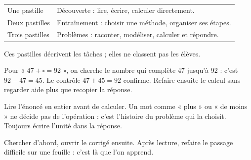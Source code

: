 \clearpage\thispagestyle{otFront}\label{mode-emploi}\fontsize{11}{15}\selectfont

\begin{tabularx}{\linewidth}{@{}lY@{}}\toprule
Une pastille & Découverte : lire, écrire, calculer directement.\\[3mm]
Deux pastilles & Entraînement : choisir une méthode, organiser ses étapes.\\[3mm]
Trois pastilles & Problèmes : raconter, modéliser, calculer et répondre.\\\bottomrule
\end{tabularx}\par\medskip
Ces pastilles décrivent les tâches ; elles ne classent pas les élèves.\par\medskip
\begin{exemple}Pour « $47+\square=92$ », on cherche le
nombre qui complète 47 jusqu’à 92 : c’est $92-47=45$. Le contrôle
$47+45=92$ confirme. Refaire ensuite le calcul sans regarder
aide plus que recopier la réponse.\end{exemple}
\begin{attention}Lire l’énoncé en entier avant de calculer. Un mot comme
« plus » ou « de moins » ne décide pas de l’opération : c’est l’histoire
du problème qui la choisit. Toujours écrire l’unité dans la réponse.\end{attention}
Chercher d’abord, ouvrir le corrigé ensuite. Après lecture, refaire le
passage difficile sur une feuille : c’est là que l’on apprend.

\clearpage
